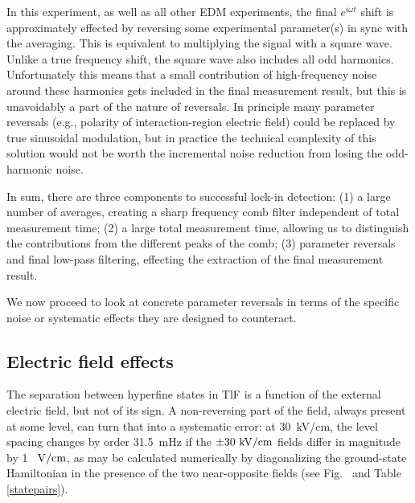 In this experiment, as well as all other \gls{EDM} experiments, the final
$e^{i\omega t}$ shift is approximately effected by reversing some experimental
parameter(s) in sync with the averaging. This is equivalent to multiplying the
signal with a square wave. Unlike a true frequency shift, the square wave also
includes all odd harmonics. Unfortunately this means that a small contribution
of high-frequency noise around these harmonics gets included in the final
measurement result, but this is unavoidably a part of the nature of reversals.
In principle many parameter reversals (e.g., polarity of interaction-region
electric field) could be replaced by true sinusoidal modulation, but in practice
the technical complexity of this solution would not be worth the incremental
noise reduction from losing the odd-harmonic noise.

In sum, there are three components to successful lock-in detection: (1) a large
number of averages, creating a sharp frequency comb filter independent of total
measurement time; (2) a large total measurement time, allowing us to distinguish
the contributions from the different peaks of the comb; (3) parameter reversals
and final low-pass filtering, effecting the extraction of the final measurement
result.

We now proceed to look at concrete parameter reversals in terms of the specific
noise or systematic effects they are designed to counteract.

\subsection{Electric field effects}

The separation between hyperfine states in TlF is a function of the external
electric field, but not of its sign. A non-reversing part of the field, always
present at some level, can turn that into a systematic error: at 30~kV/cm, the
level spacing changes by order 31.5~mHz if the $\pm30~\mathrm{kV/cm}$ fields differ in
magnitude by 1~$~\mathrm{V/cm}$, as may be calculated numerically by diagonalizing the
ground-state Hamiltonian in the presence of the two near-opposite fields (see
Fig.~ and Table \ref{statepairs}).

